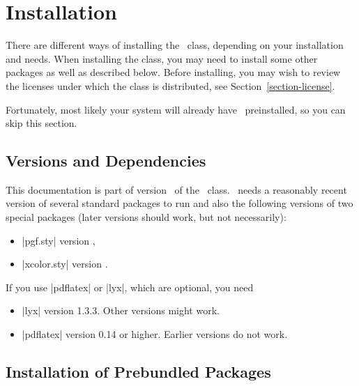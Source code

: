 %
%
%


\section{Installation}

\label{section-installation}

There are different ways of installing the \beamer\ class, depending
on your installation and needs. When installing the class, you may
need to install some other packages as well as described below. Before
installing, you may wish to review the licenses under
which the class is distributed, see Section~\ref{section-license}.

Fortunately, most likely your system will already have \beamer\
preinstalled, so you can skip this section.


\subsection{Versions and Dependencies}

This documentation is part of version \version\ of the \beamer\
class. \beamer\ needs a reasonably recent version of several standard
packages to run and also the following versions of two special
packages (later versions should work, but not necessarily): 
\begin{itemize}
\item
  |pgf.sty| version \pgfversion,
\item
  |xcolor.sty| version \xcolorversion.
\end{itemize}

If you use |pdflatex| or |lyx|, which are optional, you need
\begin{itemize}
\item
  |lyx| version 1.3.3. Other versions might work.
\item
  |pdflatex| version 0.14 or higher. Earlier versions do not work. 
\end{itemize}



\subsection{Installation of Prebundled Packages}

